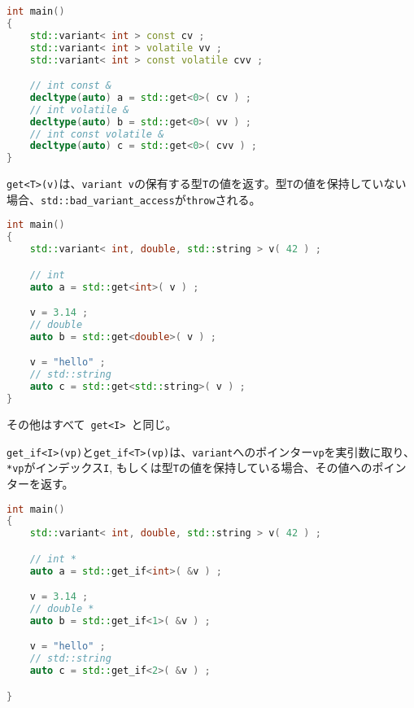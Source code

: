 \begin{lstlisting}[language=C++]
int main()
{
    std::variant< int > const cv ;
    std::variant< int > volatile vv ;
    std::variant< int > const volatile cvv ;

    // int const &
    decltype(auto) a = std::get<0>( cv ) ;
    // int volatile &
    decltype(auto) b = std::get<0>( vv ) ;
    // int const volatile &
    decltype(auto) c = std::get<0>( cvv ) ;
}
\end{lstlisting}

%

\lstinline!get<T>(v)!は、\lstinline!variant v!の保有する型\lstinline!T!の値を返す。型\lstinline!T!の値を保持していない場合、\lstinline!std::bad_variant_access!が\lstinline!throw!される。

\begin{lstlisting}[language=C++]
int main()
{
    std::variant< int, double, std::string > v( 42 ) ;

    // int
    auto a = std::get<int>( v ) ;

    v = 3.14 ;
    // double
    auto b = std::get<double>( v ) ;

    v = "hello" ;
    // std::string
    auto c = std::get<std::string>( v ) ;
}
\end{lstlisting}

その他はすべて~\lstinline!get<I>!~と同じ。

%

\lstinline!get_if<I>(vp)!と\lstinline!get_if<T>(vp)!は、\lstinline!variant!へのポインター\lstinline!vp!を実引数に取り、\lstinline!*vp!がインデックス\lstinline!I!,
もしくは型\lstinline!T!の値を保持している場合、その値へのポインターを返す。

\begin{lstlisting}[language=C++]
int main()
{
    std::variant< int, double, std::string > v( 42 ) ;

    // int *
    auto a = std::get_if<int>( &v ) ; 

    v = 3.14 ;
    // double *
    auto b = std::get_if<1>( &v ) ;

    v = "hello" ;
    // std::string
    auto c = std::get_if<2>( &v ) ;

}
\end{lstlisting}

